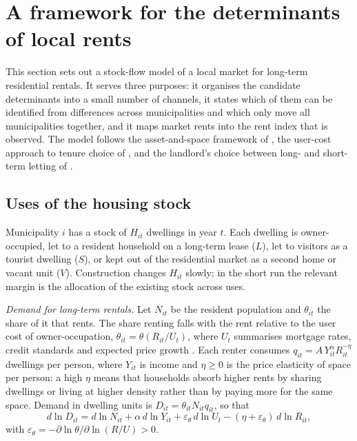 \section{A framework for the determinants of local rents}\label{sec:theory}

This section sets out a stock-flow model of a local market for long-term residential rentals. It serves three purposes: it organises the candidate determinants into a small number of channels, it states which of them can be identified from differences across municipalities and which only move all municipalities together, and it maps market rents into the rent index that is observed. The model follows the asset-and-space framework of \citet{dipasquale1992}, the user-cost approach to tenure choice of \citet{poterba1984}, and the landlord's choice between long- and short-term letting of \citet{barron2021}.

\subsection{Uses of the housing stock}

Municipality $i$ has a stock of $H_{it}$ dwellings in year $t$. Each dwelling is owner-occupied, let to a resident household on a long-term lease ($L$), let to visitors as a tourist dwelling ($S$), or kept out of the residential market as a second home or vacant unit ($V$). Construction changes $H_{it}$ slowly; in the short run the relevant margin is the allocation of the existing stock across uses.

\textit{Demand for long-term rentals.} Let $N_{it}$ be the resident population and $\theta_{it}$ the share of it that rents. The share renting falls with the rent relative to the user cost of owner-occupation, $\theta_{it}=\theta(R_{it}/U_t)$, where $U_t$ summarises mortgage rates, credit standards and expected price growth \citep{poterba1984,himmelberg2005}. Each renter consumes $q_{it}=A\,Y_{it}^{\alpha}R_{it}^{-\eta}$ dwellings per person, where $Y_{it}$ is income and $\eta\ge0$ is the price elasticity of space per person: a high $\eta$ means that households absorb higher rents by sharing dwellings or living at higher density rather than by paying more for the same space. Demand in dwelling units is $D_{it}=\theta_{it}N_{it}q_{it}$, so that
\begin{equation}\label{eq:demand}
d\ln D_{it}= d\ln N_{it}+\alpha\, d\ln Y_{it}+\varepsilon_\theta\, d\ln U_t-(\eta+\varepsilon_\theta)\,d\ln R_{it},
\end{equation}
with $\varepsilon_\theta=-\partial\ln\theta/\partial\ln(R/U)>0$.

